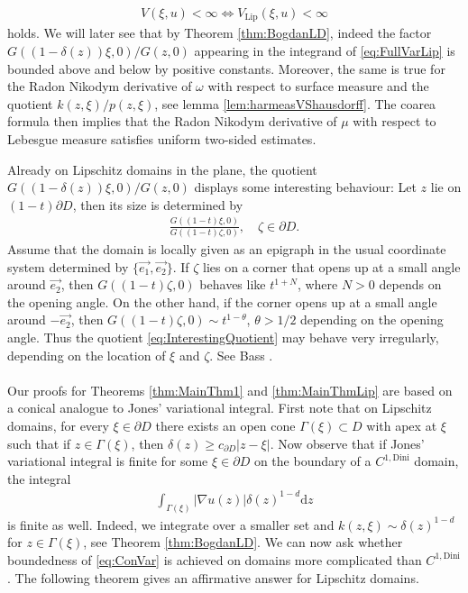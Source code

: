 \documentclass[a4paper,12pt]{article}
\theoremstyle{definition}
\theoremstyle{definition}
\begin{document}
	\begin{align*}
		V(\xi,u)<\infty\Leftrightarrow V_{\mathrm{Lip}}(\xi,u)<\infty
	\end{align*}
 	holds. We will later see that by Theorem \ref{thm:BogdanLD}, indeed the factor $G((1-\delta(z))\xi,0)/G(z,0)$ appearing in the integrand of \eqref{eq:FullVarLip} is bounded above and below by positive constants. Moreover, the same is true for the Radon Nikodym derivative of $\omega$ with respect to surface measure and the quotient $k(z,\xi)/p(z,\xi)$, see lemma \ref{lem:harmeasVShausdorff}. The coarea formula then implies that the Radon Nikodym derivative of $\mu$ with respect to Lebesgue measure satisfies uniform two-sided estimates.
 	\par Already on Lipschitz domains in the plane, the quotient $G((1-\delta(z))\xi,0)/ G(z,0)$ displays some interesting behaviour: Let $z$ lie on $(1-t)\partial D$, then its size is determined by
 	\begin{align}\label{eq:InterestingQuotient}
 		\frac{G((1-t)\xi,0)}{G((1-t)\zeta,0)},\quad\zeta\in\partial D.
 	\end{align}
 	Assume that the domain is locally given as an epigraph in the usual coordinate system determined by $\lbrace\vec{e_1},\vec{e_2}\rbrace$. If  $\zeta$ lies on a corner that opens up at a small angle around $\vec{e_2}$, then $G((1-t)\zeta,0)$ behaves like $t^{1+N}$, where $N>0$ depends on the opening angle. On the other hand, if the corner opens up at a small angle around $-\vec{e_2}$, then $G((1-t)\zeta,0)\sim t^{1-\theta}$, $\theta>1/2$ depending on the opening angle. Thus the quotient \eqref{eq:InterestingQuotient} may behave very irregularly, depending on the location of $\xi$ and $\zeta$. See Bass \cite{Bass}.
	\\\\
	Our proofs for Theorems \ref{thm:MainThm1} and \ref{thm:MainThmLip} are based on a conical analogue to Jones' variational integral. First note that on Lipschitz domains, for every $\xi\in\partial D$ there exists an open cone $\Gamma(\xi)\subset D$ with apex at $\xi$ such that if $z\in\Gamma(\xi)$, then $\delta(z)\geq c_{\partial D}|z-\xi|$. Now observe that if Jones' variational integral is finite for some $\xi\in\partial D$ on the boundary of a $C^{1,\mathrm{Dini}}$ domain, the integral 
	\begin{align}\label{eq:ConVar}
		\int_{\Gamma(\xi)}|\nabla u(z)|\delta(z)^{1-d}\mathrm{d}z
	\end{align}	
	is finite as well. Indeed, we integrate over a smaller set and $k(z,\xi)\sim \delta(z)^{1-d}$ for $z\in\Gamma(\xi)$, see Theorem \ref{thm:BogdanLD}. We can now ask whether boundedness of \eqref{eq:ConVar} is achieved on domains more complicated than $C^{1,\mathrm{Dini}}$. The following theorem gives an affirmative answer for Lipschitz domains.
\end{document}

